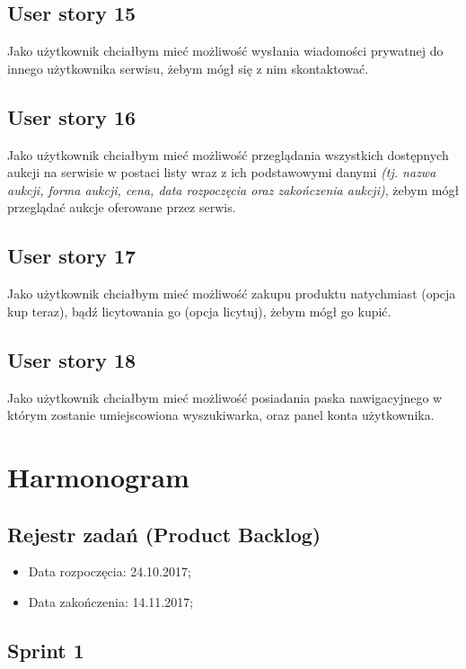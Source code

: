 \documentclass[a4paper]{article}
\begin{document}
	\subsection{User story 15}
	Jako użytkownik chciałbym mieć możliwość wysłania wiadomości prywatnej do innego użytkownika serwisu, żebym mógł się z nim skontaktować. 
	
	\subsection{User story 16}
	Jako użytkownik chciałbym mieć możliwość przeglądania wszystkich dostępnych aukcji na serwisie w postaci listy wraz z ich podstawowymi danymi \emph{(tj. nazwa aukcji, forma aukcji, cena, data rozpoczęcia oraz zakończenia aukcji)}, żebym mógł przeglądać aukcje oferowane przez serwis.
	
	\subsection{User story 17}
	Jako użytkownik chciałbym mieć możliwość zakupu produktu natychmiast (opcja kup teraz), bądź licytowania go (opcja licytuj), żebym mógł go kupić.
	
	\subsection{User story 18}
	Jako użytkownik chciałbym mieć możliwość posiadania paska nawigacyjnego w którym zostanie umiejscowiona wyszukiwarka, oraz panel konta użytkownika.
		
	\section{Harmonogram}
	
	\subsection{Rejestr zadań (Product Backlog)}
	
		\begin{itemize}
		\item Data rozpoczęcia: 24.10.2017;
		\item  Data zakończenia: 14.11.2017;
	\end{itemize}
	
	\subsection{Sprint 1}
	
\end{document}
